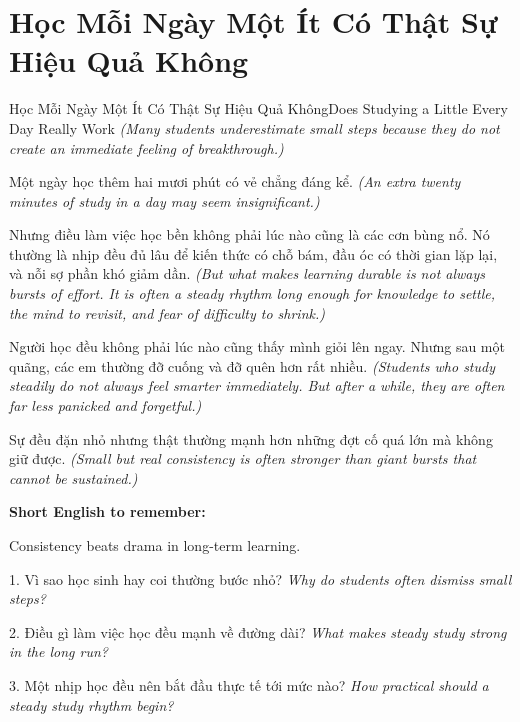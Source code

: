 \section{Học Mỗi Ngày Một Ít Có Thật Sự Hiệu Quả Không}
\begin{truyen}{Học Mỗi Ngày Một Ít Có Thật Sự Hiệu Quả Không}{Does Studying a Little Every Day Really Work}
\textit{(Many students underestimate small steps because they do not create an immediate feeling of breakthrough.)}

Một ngày học thêm hai mươi phút có vẻ chẳng đáng kể.
\textit{(An extra twenty minutes of study in a day may seem insignificant.)}

Nhưng điều làm việc học bền không phải lúc nào cũng là các cơn bùng nổ. Nó thường là nhịp đều đủ lâu để kiến thức có chỗ bám, đầu óc có thời gian lặp lại, và nỗi sợ phần khó giảm dần.
\textit{(But what makes learning durable is not always bursts of effort. It is often a steady rhythm long enough for knowledge to settle, the mind to revisit, and fear of difficulty to shrink.)}

Người học đều không phải lúc nào cũng thấy mình giỏi lên ngay. Nhưng sau một quãng, các em thường đỡ cuống và đỡ quên hơn rất nhiều.
\textit{(Students who study steadily do not always feel smarter immediately. But after a while, they are often far less panicked and forgetful.)}
\end{truyen}

\begin{baihoc}
Sự đều đặn nhỏ nhưng thật thường mạnh hơn những đợt cố quá lớn mà không giữ được.
\textit{(Small but real consistency is often stronger than giant bursts that cannot be sustained.)}
\end{baihoc}

\begin{ghinhoanh}
\textbf{Short English to remember:}

Consistency beats drama in long-term learning.

\end{ghinhoanh}

\begin{tuhocnhanh}
1. Vì sao học sinh hay coi thường bước nhỏ? \textit{Why do students often dismiss small steps?}

2. Điều gì làm việc học đều mạnh về đường dài? \textit{What makes steady study strong in the long run?}

3. Một nhịp học đều nên bắt đầu thực tế tới mức nào? \textit{How practical should a steady study rhythm begin?}
\end{tuhocnhanh}
\ngancach

